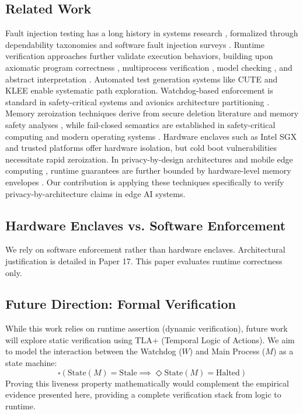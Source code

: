 \documentclass[conference]{IEEEtran}
\begin{document}
\subsection{Related Work}
Fault injection testing has a long history in systems research \cite{b1, b2}, formalized through dependability taxonomies \cite{b24} and software fault injection surveys \cite{b18}. Runtime verification approaches \cite{b11, b16} further validate execution behaviors, building upon axiomatic program correctness \cite{b19}, multiprocess verification \cite{b15}, model checking \cite{b14}, and abstract interpretation \cite{b28}. Automated test generation systems like CUTE \cite{b26} and KLEE \cite{b27} enable systematic path exploration. Watchdog-based enforcement is standard in safety-critical systems \cite{b3, b12} and avionics architecture partitioning \cite{b22}. Memory zeroization techniques derive from secure deletion literature \cite{b4} and memory safety analyses \cite{b8, b10}, while fail-closed semantics are established in safety-critical computing \cite{b5} and modern operating systems \cite{b21}. Hardware enclaves such as Intel SGX \cite{b20} and trusted platforms \cite{b23} offer hardware isolation, but cold boot vulnerabilities \cite{b29} necessitate rapid zeroization. In privacy-by-design architectures \cite{b6} and mobile edge computing \cite{b7}, runtime guarantees are further bounded by hardware-level memory envelopes \cite{b25}. Our contribution is applying these techniques specifically to verify privacy-by-architecture claims in edge AI systems.

\subsection{Hardware Enclaves vs. Software Enforcement}
We rely on software enforcement rather than hardware enclaves. Architectural justification is detailed in Paper 17. This paper evaluates runtime correctness only.

\subsection{Future Direction: Formal Verification}
While this work relies on runtime assertion (dynamic verification), future work will explore static verification using TLA+ (Temporal Logic of Actions). We aim to model the interaction between the Watchdog ($W$) and Main Process ($M$) as a state machine:
\begin{equation}
\square (\text{State}(M) = \text{Stale} \implies \Diamond \text{State}(M) = \text{Halted})
\end{equation}
Proving this liveness property mathematically would complement the empirical evidence presented here, providing a complete verification stack from logic to runtime.
\end{document}
